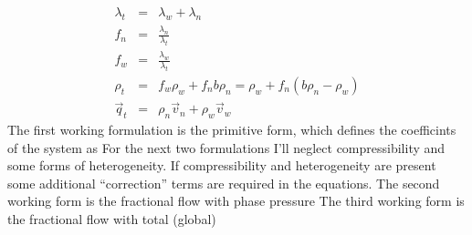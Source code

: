 \documentclass[10pt,dvips,twoside,reqno]{amsart}
\begin{document}
\begin{eqnarray}
\lambda_t &=&  \lambda_w + \lambda_n \\
f_n &=& \frac{\lambda_n}{\lambda_t}\\
f_w &=& \frac{\lambda_w}{\lambda_t}\\
\rho_t &=& f_w\rho_w  + f_n b \rho_n = \rho_w + f_n (b \rho_n - \rho_w)\\
\vec q_t &=& \rho_n \vec v_n + \rho_w \vec v_w
\end{eqnarray}
The first working formulation is the primitive form, which defines the coefficints of the system as
For the next two formulations I'll neglect compressibility and some
forms of heterogeneity. If compressibility and heterogeneity are
present some additional ``correction'' terms are required in the
equations.  The second working form is the fractional flow with phase
pressure
The third working form is the fractional flow with total (global)
\end{document}
